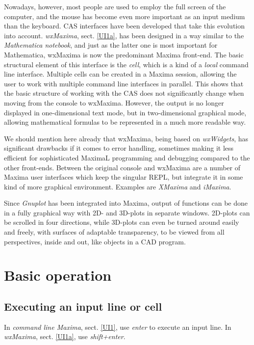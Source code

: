 \documentclass[../Maxima_Workbook.tex]{subfiles}
\begin{document}
\lz Nowadays, however, most people are used to employ the full screen of the computer, and the mouse has become even more important as an input medium than the keyboard. CAS interfaces have been developed that take this evolution into account. \emph{wxMaxima}, sect. \ref{UI1a}, has been designed in a way similar to the \emph{Mathematica notebook}, and just as the latter one is most important for Mathematica, wxMaxima is now the predominant Maxima front-end. The basic structural element of this interface is the \emph{cell}, which is a kind of a \emph{local} command line interface. Multiple cells can be created in a Maxima session, allowing the user to work with multiple command line interfaces in parallel. This shows that the basic structure of working with the CAS does not significantly change when moving from the console to wxMaxima. However, the output is no longer displayed in one-dimensional text mode, but in two-dimensional graphical mode, allowing mathematical formulas to be represented in a much more readable way. 

\lz We should mention here already that wxMaxima, being based on \emph{wxWidgets}, has significant drawbacks if it comes to error handling, sometimes making it less efficient for sophisticated MaximaL programming and debugging compared to the other front-ends. Between the original console and wxMaxima are a number of Maxima user interfaces which keep the singular REPL, but integrate it in some kind of more graphical environment. Examples are \emph{XMaxima} and \emph{iMaxima}.

\lz Since \emph{Gnuplot} has been integrated into Maxima, output of functions can be done in a fully graphical way with 2D- and 3D-plots in separate windows. 2D-plots can be scrolled in four directions, while 3D-plots can even be turned around easily and freely, with surfaces of adaptable transparency, to be viewed from all perspectives, inside and out, like objects in a CAD program.

\section{Basic operation}

\subsection{Executing an input line or cell}

In \emph{command line Maxima}, sect. \ref{UI1}, use \emph{enter} to execute an input line. In \emph{wxMaxima}, sect. \ref{UI1a}, use \emph{shift+enter}.
\end{document}
